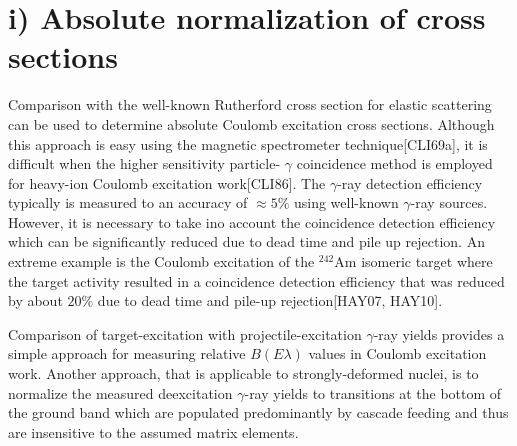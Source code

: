 \documentclass[10pt]{article}
\begin{document}
\section*{i) Absolute normalization of cross sections}
Comparison with the well-known Rutherford cross section for elastic scattering can be used to determine absolute Coulomb excitation cross sections. Although this approach is easy using the magnetic spectrometer technique[CLI69a], it is difficult when the higher sensitivity particle- $\gamma$ coincidence method is employed for heavy-ion Coulomb excitation work[CLI86]. The $\gamma$-ray detection efficiency typically is measured to an accuracy of $\approx 5 \%$ using well-known $\gamma$-ray sources. However, it is necessary to take ino account the coincidence detection efficiency which can be significantly reduced due to dead time and pile up rejection. An extreme example is the Coulomb excitation of the ${ }^{242} \mathrm{Am}$ isomeric target where the target activity resulted in a coincidence detection efficiency that was reduced by about $20 \%$ due to dead time and pile-up rejection[HAY07, HAY10].

Comparison of target-excitation with projectile-excitation $\gamma$-ray yields provides a simple approach for measuring relative $B(E \lambda)$ values in Coulomb excitation work. Another approach, that is applicable to strongly-deformed nuclei, is to normalize the measured deexcitation $\gamma$-ray yields to transitions at the bottom of the ground band which are populated predominantly by cascade feeding and thus are insensitive to the assumed matrix elements.
\end{document}

